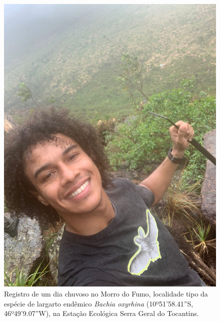 \documentclass[12pt,openright,oneside,a4paper,english]{abntex2}
\begin{document}
\pagebreak

\nolinenumbers

\listoffigures
\listoftables
\newpage




\pagebreak

\begin{figure}
	\centering
	\includegraphics[width=160mm]{Fig JP}
	\caption*{\small Registro de um dia chuvoso no Morro do Fumo, localidade tipo da espécie de largarto endêmico \textit{Bachia oxyrhina} (10º51’58.41”S, 46º49’9.07”W), na Estação Ecológica Serra Geral do Tocantins.}
\end{figure}
\end{document}

